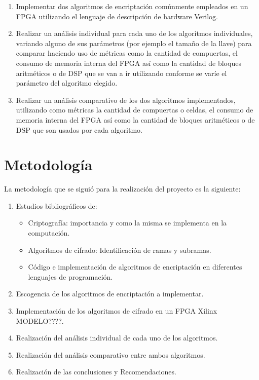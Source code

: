\begin{enumerate}

\item Implementar dos algoritmos de encriptación comúnmente empleados en un FPGA utilizando el lenguaje de descripción de hardware Verilog.

\item Realizar un análisis individual para cada uno de los algoritmos individuales, variando alguno de sus parámetros (por ejemplo el tamaño de la llave) para comparar haciendo uso de métricas como la cantidad de compuertas, el consumo de memoria interna del FPGA así como la cantidad de bloques aritméticos o de DSP que se van a ir utilizando conforme se varíe el parámetro del algoritmo elegido.

\item Realizar un análisis comparativo de los dos algoritmos implementados, utilizando como métricas la cantidad de compuertas o celdas, el consumo de memoria interna del FPGA así como la cantidad de bloques aritméticos o de DSP que son usados por cada algoritmo.


\end{enumerate}

\section{Metodología}

La metodología que se siguió para la realización del proyecto es la siguiente:

\begin{enumerate}

\item Estudios bibliográficos de:

\begin{itemize}
	\item Criptografía: importancia y como la misma se implementa en la computación.
	\item Algoritmos de cifrado: Identificación de ramas y subramas.
	\item Código e implementación de algoritmos de encriptación en diferentes lenguajes de programación.
\end{itemize}

\item Escogencia de los algoritmos de encriptación a implementar.

\item Implementación de los algoritmos de cifrado en un FPGA Xilinx MODELO????.

\item Realización del análisis individual de cada uno de los algoritmos.

\item Realización del análisis comparativo entre ambos algoritmos.

\item Realización de las conclusiones y Recomendaciones.

\end{enumerate}

